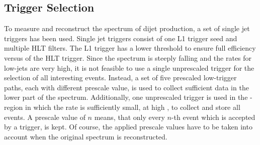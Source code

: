 \subsection{Trigger Selection}

To measure and reconstruct the \ptavg spectrum of dijet production, a set of
single jet triggers has been used. Single jet triggers consist of one L1 trigger
seed and multiple HLT filters. The L1 trigger has a lower threshold to ensure
full efficiency versus \pt of the HLT trigger. Since the \pt spectrum is steeply
falling and the rates for low-\pt jets are very high, it is not feasible to use
a single unprescaled trigger for the selection of all interesting events.
Instead, a set of five prescaled low-\pt trigger paths, each with different
prescale value, is used to collect sufficient data in the lower part of the \pt
spectrum.  Additionally, one unprescaled trigger is used in the \pt-region in
which the rate is sufficiently small, \ie at high \pt, to collect and store all
events. A prescale value of $n$ means, that only every $n$-th event which is accepted by
a trigger, is kept. Of course, the applied prescale values have to be taken into
account when the original spectrum is reconstructed. 

